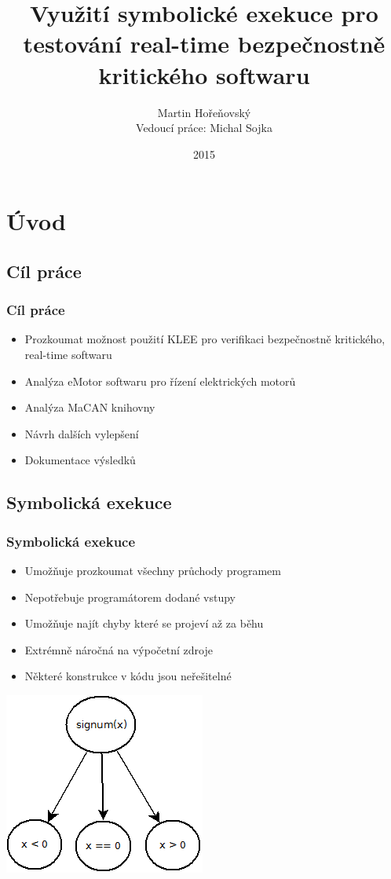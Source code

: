 \documentclass{beamer}
\author[Martin Hořeňovský]{Martin Hořeňovský\\{\small Vedoucí práce: Michal Sojka}}
\title{Využití symbolické exekuce pro testování real-time bezpečnostně
kritického softwaru}
\institute{FEL ČVUT}
\date{2015}
\begin{document}
\begin{frame}
\titlepage
\end{frame}


\section{Úvod}

\subsection*{Cíl práce}
\begin{frame}
\frametitle{Cíl práce}
\begin{itemize}
    \item Prozkoumat možnost použití KLEE pro verifikaci bezpečnostně
    kritického, real-time softwaru
    \item Analýza eMotor softwaru pro řízení elektrických motorů
    \item Analýza MaCAN knihovny
    \item Návrh dalších vylepšení
    \vspace*{1cm}
    \item Dokumentace výsledků
\end{itemize}
\end{frame}

\subsection*{Symbolická exekuce}
\begin{frame}
\frametitle{Symbolická exekuce}
\begin{itemize}
    \item Umožňuje prozkoumat všechny průchody programem
    \item Nepotřebuje programátorem dodané vstupy
    \item Umožňuje najít chyby které se projeví až za běhu
    \item Extrémně náročná na výpočetní zdroje
    \item Některé konstrukce v kódu jsou neřešitelné
\end{itemize}
\begin{center}
\includegraphics[scale=0.5]{symb-exec.png}
\end{center}
\end{frame}
\end{document}
